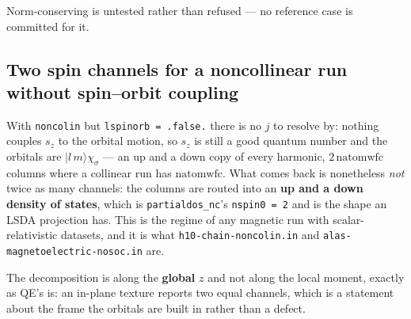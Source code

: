 \documentclass[11pt,a4paper]{article}
\newcommand{\code}[1]{\texttt{\small #1}}
\begin{document}
Norm-conserving is untested rather than refused --- no reference case is
committed for it.

\subsection*{Two spin channels for a noncollinear run without spin--orbit coupling}

With \code{noncolin} but \code{lspinorb = .false.} there is no $j$ to resolve
by: nothing couples $s_z$ to the orbital motion, so $s_z$ is still a good
quantum number and the orbitals are $|l\,m\rangle\chi_\sigma$ --- an up and a
down copy of every harmonic, $2\,\mathrm{natomwfc}$ columns where a collinear
run has $\mathrm{natomwfc}$. What comes back is nonetheless \emph{not} twice as
many channels: the columns are routed into an \textbf{up and a down density of
states}, which is \code{partialdos\_nc}'s \code{nspin0 = 2} and is the shape an
LSDA projection has. This is the regime of any magnetic run with
scalar-relativistic datasets, and it is what \code{h10-chain-noncolin.in} and
\code{alas-magnetoelectric-nosoc.in} are.


The decomposition is along the \textbf{global} $z$ and not along the local
moment, exactly as QE's is: an in-plane texture reports two equal channels,
which is a statement about the frame the orbitals are built in rather than a
defect.
\end{document}
